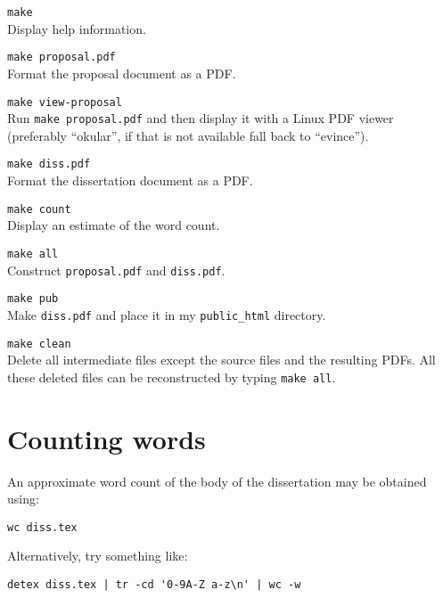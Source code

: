 \documentclass[a4paper,12pt,twoside,openright]{report}
\begin{document}
	\begin{description}
		
		\item\texttt{make} \\
		Display help information.
		
		\item\texttt{make proposal.pdf} \\
		Format the proposal document as a PDF.
		
		\item\texttt{make view-proposal} \\
		Run \texttt{make proposal.pdf} and then display it with a Linux PDF viewer
		(preferably ``okular'', if that is not available fall back to ``evince'').
		
		\item\texttt{make diss.pdf} \\
		Format the dissertation document as a PDF.
		
		\item\texttt{make count} \\
		Display an estimate of the word count.
		
		\item\texttt{make all} \\
		Construct \texttt{proposal.pdf} and \texttt{diss.pdf}.
		
		\item\texttt{make pub} \\ Make \texttt{diss.pdf}
		and place it in my \texttt{public\_html} directory.
		
		\item\texttt{make clean} \\ Delete all intermediate files except the
		source files and the resulting PDFs. All these deleted files can
		be reconstructed by typing \texttt{make all}.
		
	\end{description}
	
	
	\section{Counting words}
	
	An approximate word count of the body of the dissertation may be
	obtained using:
	
	\texttt{wc diss.tex}
	
	\noindent
	Alternatively, try something like:
	
	\verb/detex diss.tex | tr -cd '0-9A-Z a-z\n' | wc -w/
	
\end{document}
